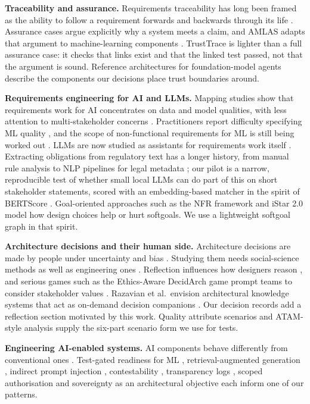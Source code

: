 \documentclass[10pt,twocolumn]{article}
\begin{document}
\textbf{Traceability and assurance.} Requirements traceability has long been framed as the ability to follow a requirement forwards and backwards through its life \cite{gotel1994,cleland2014}. Assurance cases argue explicitly why a system meets a claim, and AMLAS adapts that argument to machine-learning components \cite{hawkins2021}. TrustTrace is lighter than a full assurance case: it checks that links exist and that the linked test passed, not that the argument is sound. Reference architectures for foundation-model agents \cite{lu2023ra} describe the components our decisions place trust boundaries around.

\textbf{Requirements engineering for AI and LLMs.} Mapping studies show that requirements work for AI concentrates on data and model qualities, with less attention to multi-stakeholder concerns \cite{ahmad2023}. Practitioners report difficulty specifying ML quality \cite{vogelsang2019}, and the scope of non-functional requirements for ML is still being worked out \cite{habibullah2024}. LLMs are now studied as assistants for requirements work itself \cite{ronanki2023,arora2024}. Extracting obligations from regulatory text has a longer history, from manual rule analysis \cite{breaux2008} to NLP pipelines for legal metadata \cite{sleimi2018}; our pilot is a narrow, reproducible test of whether small local LLMs can do part of this on short stakeholder statements, scored with an embedding-based matcher in the spirit of BERTScore \cite{zhang2020}. Goal-oriented approaches such as the NFR framework \cite{chung2000} and iStar 2.0 \cite{dalpiaz2016} model how design choices help or hurt softgoals. We use a lightweight softgoal graph in that spirit.

\textbf{Architecture decisions and their human side.} Architecture decisions are made by people under uncertainty and bias \cite{tang2017}. Studying them needs social-science methods as well as engineering ones \cite{razavian2019}. Reflection influences how designers reason \cite{razavian2016}, and serious games such as the Ethics-Aware DecidArch game prompt teams to consider stakeholder values \cite{alidoosti2023}. Razavian et al.\ envision architectural knowledge systems that act as on-demand decision companions \cite{razavian2023}. Our decision records add a reflection section motivated by this work. Quality attribute scenarios and ATAM-style analysis \cite{kazman2000} supply the six-part scenario form we use for tests.

\textbf{Engineering AI-enabled systems.} AI components behave differently from conventional ones \cite{ozkaya2020}. Test-gated readiness for ML \cite{breck2017}, retrieval-augmented generation \cite{lewis2020}, indirect prompt injection \cite{greshake2023}, contestability \cite{alfrink2022}, transparency logs \cite{rfc6962}, scoped authorisation \cite{rfc6749} and sovereignty as an architectural objective \cite{esposito2026} each inform one of our patterns.
\end{document}
